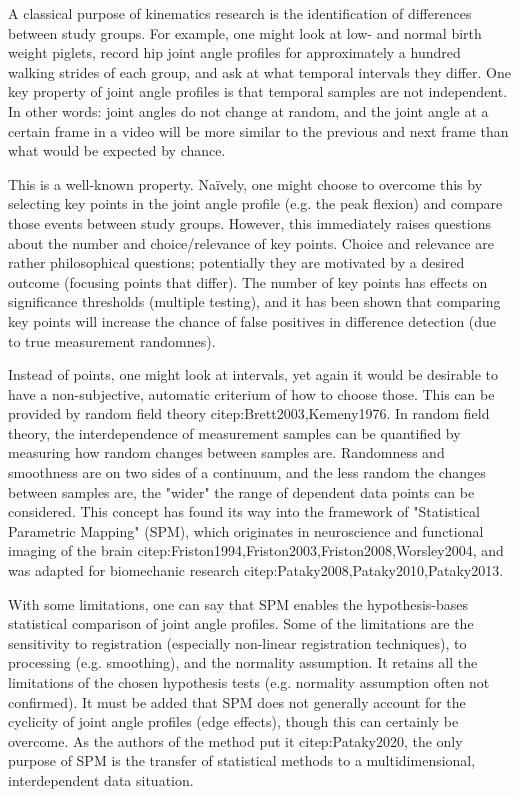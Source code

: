 \begin{change}
A classical purpose of kinematics research is the identification of differences between study groups.
For example, one might look at low- and normal birth weight piglets, record hip joint angle profiles for approximately a hundred walking strides of each group, and ask at what temporal intervals they differ.
One key property of joint angle profiles is that temporal samples are not independent.
In other words: joint angles do not change at random, and the joint angle at a certain frame in a video will be more similar to the previous and next frame than what would be expected by chance.

This is a well-known property.
Naïvely, one might choose to overcome this by selecting key points in the joint angle profile (e.g. the peak flexion) and compare those events between study groups.
However, this immediately raises questions about the number and choice/relevance of key points.
Choice and relevance are rather philosophical questions; potentially they are motivated by a desired outcome (focusing points that differ).
The number of key points has effects on significance thresholds (multiple testing), and it has been shown that comparing key points will increase the chance of false positives in difference detection (due to true measurement randomnes).

Instead of points, one might look at intervals, yet again it would be desirable to have a non-subjective, automatic criterium of how to choose those.
This can be provided by random field theory citep:Brett2003,Kemeny1976.
In random field theory, the interdependence of measurement samples can be quantified by measuring how random changes between samples are.
Randomness and smoothness are on two sides of a continuum, and the less random the changes between samples are, the "wider" the range of dependent data points can be considered.
This concept has found its way into the framework of "Statistical Parametric Mapping" (SPM), which originates in neuroscience and functional imaging of the brain citep:Friston1994,Friston2003,Friston2008,Worsley2004, and was adapted for biomechanic research citep:Pataky2008,Pataky2010,Pataky2013.

With some limitations, one can say that SPM enables the hypothesis-bases statistical comparison of joint angle profiles.
Some of the limitations are the sensitivity to registration (especially non-linear registration techniques), to processing (e.g. smoothing), and the normality assumption.
It retains all the limitations of the chosen hypothesis tests (e.g. normality assumption often not confirmed).
It must be added that SPM does not generally account for the cyclicity of joint angle profiles (edge effects), though this can certainly be overcome.
As the authors of the method put it citep:Pataky2020, the only purpose of SPM is the transfer of statistical methods to a multidimensional, interdependent data situation.



\end{change}

